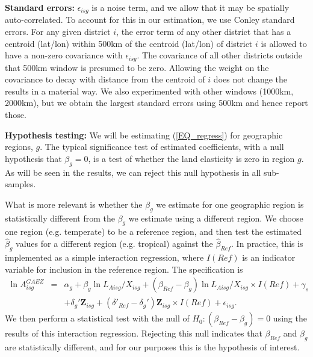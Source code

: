 \documentclass[11pt]{article}
\begin{document}
\vspace{.5cm}\noindent\textbf{Standard errors:} $\epsilon_{isg}$ is a noise term, and we allow that it may be spatially auto-correlated. To account for this in our estimation, we use Conley standard errors. For any given district $i$, the error term of any other district that has a centroid (lat/lon) within 500km of the centroid (lat/lon) of district $i$ is allowed to have a non-zero covariance with $\epsilon_{isg}$. The covariance of all other districts outside that 500km window is presumed to be zero. Allowing the weight on the covariance to decay with distance from the centroid of $i$ does not change the results in a material way. We also experimented with other windows (1000km, 2000km), but we obtain the largest standard errors using 500km and hence report those.

\vspace{.5cm}\noindent\textbf{Hypothesis testing:} We will be estimating (\ref{EQ_regress}) for geographic regions, $g$. The typical significance test of estimated coefficients, with a null hypothesis that $\beta_g=0$, is a test of whether the land elasticity is zero in region $g$. As will be seen in the results, we can reject this null hypothesis in all sub-samples.

What is more relevant is whether the $\beta_g$ we estimate for one geographic region is statistically different from the $\beta_g$ we estimate using a different region. We choose one region (e.g. temperate) to be a reference region, and then test the estimated $\hat{\beta}_g$ values for a different region (e.g. tropical) against the $\hat{\beta}_{Ref}$. In practice, this is implemented as a simple interaction regression, where $I(Ref)$ is an indicator variable for inclusion in the reference region. The specification is
\begin{eqnarray}
    \ln A^{GAEZ}_{isg} &=& \alpha_g + \beta_g \ln L_{Aisg}/X_{isg} + (\beta_{Ref} - \beta_g) \ln L_{Aisg}/X_{isg} \times I(Ref) + \gamma_{s} \\ \nonumber
     && + \delta_g' \mathbf{Z}_{isg} + (\delta'_{Ref} - \delta_g') \mathbf{Z}_{isg} \times I(Ref) + \epsilon_{isg}. \label{EQ_interaction}
\end{eqnarray}
We then perform a statistical test with the null of $H_0: (\beta_{Ref} - \beta_g) = 0$ using the results of this interaction regression. Rejecting this null indicates that $\beta_{Ref}$ and $\beta_g$ are statistically different, and for our purposes this is the hypothesis of interest.
\end{document}
